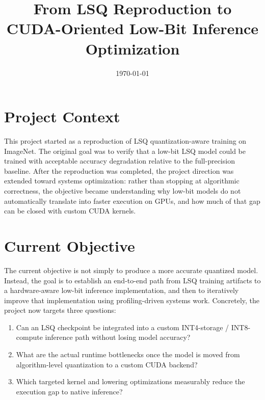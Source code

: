 \documentclass[11pt,a4paper]{article}
\title{\textbf{From LSQ Reproduction to CUDA-Oriented Low-Bit Inference Optimization}}
\author{}
\date{\today}
\begin{document}
\maketitle

\section{Project Context}
This project started as a reproduction of LSQ quantization-aware training on ImageNet. The original goal was to verify that a low-bit LSQ model could be trained with acceptable accuracy degradation relative to the full-precision baseline. After the reproduction was completed, the project direction was extended toward systems optimization: rather than stopping at algorithmic correctness, the objective became understanding why low-bit models do not automatically translate into faster execution on GPUs, and how much of that gap can be closed with custom CUDA kernels.

\section{Current Objective}
The current objective is not simply to produce a more accurate quantized model. Instead, the goal is to establish an end-to-end path from LSQ training artifacts to a hardware-aware low-bit inference implementation, and then to iteratively improve that implementation using profiling-driven systems work. Concretely, the project now targets three questions:
\begin{enumerate}
  \item Can an LSQ checkpoint be integrated into a custom INT4-storage / INT8-compute inference path without losing model accuracy?
  \item What are the actual runtime bottlenecks once the model is moved from algorithm-level quantization to a custom CUDA backend?
  \item Which targeted kernel and lowering optimizations measurably reduce the execution gap to native inference?
\end{enumerate}
\end{document}
